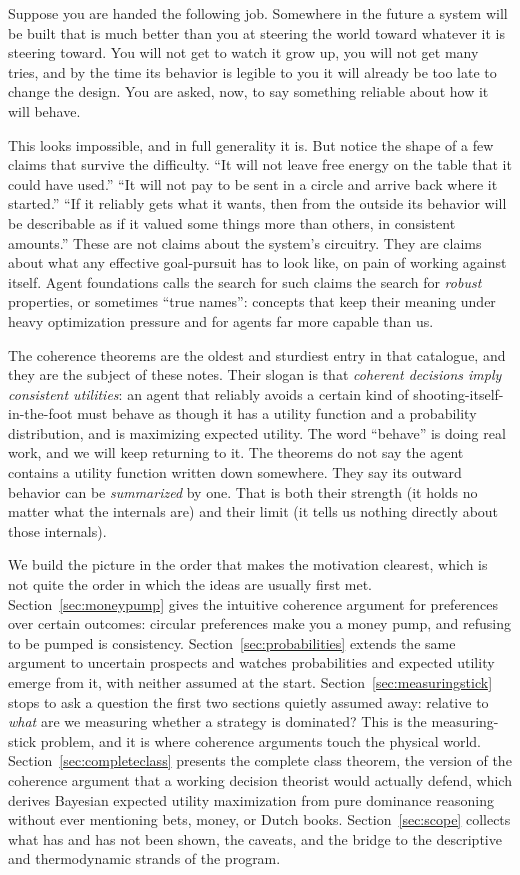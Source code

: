 \documentclass[10pt]{article}
\theoremstyle{definition}
\theoremstyle{remark}
\begin{document}
Suppose you are handed the following job. Somewhere in the future a system will be built that is much better than you at steering the world toward whatever it is steering toward. You will not get to watch it grow up, you will not get many tries, and by the time its behavior is legible to you it will already be too late to change the design. You are asked, now, to say something reliable about how it will behave.

This looks impossible, and in full generality it is. But notice the shape of a few claims that survive the difficulty. ``It will not leave free energy on the table that it could have used.'' ``It will not pay to be sent in a circle and arrive back where it started.'' ``If it reliably gets what it wants, then from the outside its behavior will be describable as if it valued some things more than others, in consistent amounts.'' These are not claims about the system's circuitry. They are claims about what any effective goal-pursuit has to look like, on pain of working against itself. Agent foundations calls the search for such claims the search for \emph{robust} properties, or sometimes ``true names'': concepts that keep their meaning under heavy optimization pressure and for agents far more capable than us.

The coherence theorems are the oldest and sturdiest entry in that catalogue, and they are the subject of these notes. Their slogan is that \emph{coherent decisions imply consistent utilities}: an agent that reliably avoids a certain kind of shooting-itself-in-the-foot must behave as though it has a utility function and a probability distribution, and is maximizing expected utility. The word ``behave'' is doing real work, and we will keep returning to it. The theorems do not say the agent contains a utility function written down somewhere. They say its outward behavior can be \emph{summarized} by one. That is both their strength (it holds no matter what the internals are) and their limit (it tells us nothing directly about those internals).

We build the picture in the order that makes the motivation clearest, which is not quite the order in which the ideas are usually first met. Section~\ref{sec:moneypump} gives the intuitive coherence argument for preferences over certain outcomes: circular preferences make you a money pump, and refusing to be pumped is consistency. Section~\ref{sec:probabilities} extends the same argument to uncertain prospects and watches probabilities and expected utility emerge from it, with neither assumed at the start. Section~\ref{sec:measuringstick} stops to ask a question the first two sections quietly assumed away: relative to \emph{what} are we measuring whether a strategy is dominated? This is the measuring-stick problem, and it is where coherence arguments touch the physical world. Section~\ref{sec:completeclass} presents the complete class theorem, the version of the coherence argument that a working decision theorist would actually defend, which derives Bayesian expected utility maximization from pure dominance reasoning without ever mentioning bets, money, or Dutch books. Section~\ref{sec:scope} collects what has and has not been shown, the caveats, and the bridge to the descriptive and thermodynamic strands of the program.
\end{document}
